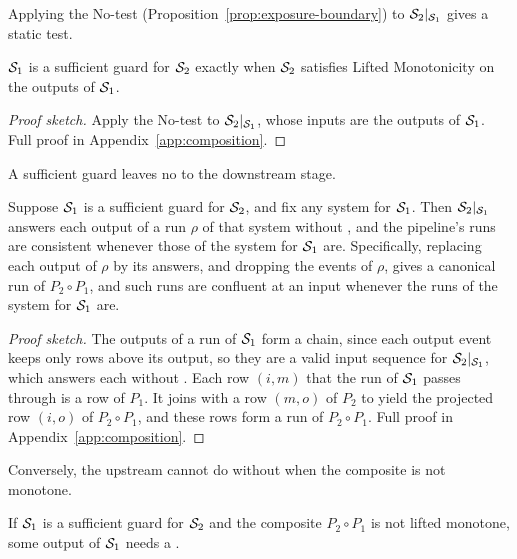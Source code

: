 Applying the No-\commitment test (Proposition~\ref{prop:exposure-boundary})
to $\mathcal{S}_2|_{\mathcal{S}_1}$ gives a static test.

\begin{proposition}
\label{prop:guard-test}
$\mathcal{S}_1$ is a sufficient guard for $\mathcal{S}_2$ exactly when
$\mathcal{S}_2$ satisfies Lifted Monotonicity on the outputs of $\mathcal{S}_1$.
\end{proposition}

\begin{proof}[Proof sketch]
Apply the No-\commitment test to $\mathcal{S}_2|_{\mathcal{S}_1}$, whose inputs are the
outputs of $\mathcal{S}_1$.  Full proof in Appendix~\ref{app:composition}.
\end{proof}

A sufficient guard leaves no \commitment to the downstream stage.

\begin{theorem}
\label{thm:sufficient-guards}
Suppose $\mathcal{S}_1$ is a sufficient guard for $\mathcal{S}_2$, and fix any
system for $\mathcal{S}_1$.  Then $\mathcal{S}_2|_{\mathcal{S}_1}$ answers each output of a run
$\rho$ of that system without \commitment, and the pipeline's runs are
consistent whenever those of the system for $\mathcal{S}_1$ are.  Specifically,
replacing each output of $\rho$ by its answers, and dropping the \commitment
events of $\rho$, gives a canonical run of $P_2\circ P_1$, and such runs are
confluent at an input whenever the runs of the system for $\mathcal{S}_1$ are.
\end{theorem}

\begin{proof}[Proof sketch]
The outputs of a run of $\mathcal{S}_1$ form a chain, since each output event keeps
only rows above its output, so they are a valid input sequence for
$\mathcal{S}_2|_{\mathcal{S}_1}$, which answers each without \commitment.  Each row
$(i,m)$ that the run of $\mathcal{S}_1$ passes through is a row of $P_1$.  It joins
with a row $(m,o)$ of $P_2$ to yield the projected row $(i,o)$ of
$P_2\circ P_1$, and these rows form a run of $P_2\circ P_1$.  Full proof in
Appendix~\ref{app:composition}.
\end{proof}

Conversely, the upstream cannot do without \commitments when the composite is
not monotone.

\begin{corollary}
\label{cor:upstream-commitments}
If $\mathcal{S}_1$ is a sufficient guard for $\mathcal{S}_2$ and the composite
$P_2\circ P_1$ is not lifted monotone, some output of $\mathcal{S}_1$ needs a
\commitment.
\end{corollary}

